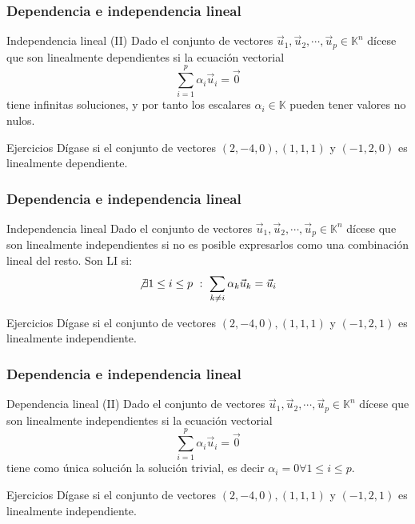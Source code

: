 \documentclass{beamer}
\begin{document}
\begin{frame}
  \frametitle{Dependencia e independencia lineal}
  \begin{block}{Independencia lineal (II)}
Dado el conjunto de vectores $\vec u_1,\vec u_2,\cdots,\vec u_p\in\mathbb K^n$ d\'icese que son linealmente dependientes si la ecuaci\'on vectorial
\[\sum_{i=1}^p \alpha_i \vec u_i = \vec 0\]
tiene infinitas soluciones, y por tanto los escalares $\alpha_i\in\mathbb K$ pueden tener valores no nulos.
\end{block}
  \begin{block}{Ejercicios}
D\'igase si el conjunto de vectores $(2,-4,0), (1,1,1)$ y $(-1,2,0)$ es linealmente dependiente.
\end{block}

\end{frame}




\begin{frame}
  \frametitle{Dependencia e independencia lineal}
  \begin{block}{Independencia lineal}
Dado el conjunto de vectores $\vec u_1,\vec u_2,\cdots,\vec u_p\in\mathbb K^n$ d\'icese que son linealmente independientes si no es posible expresarlos como una combinaci\'on lineal del resto. Son LI si:
\[\not\exists 1\leq i\leq p\ : \ \sum_{k\neq i} \alpha_k \vec u_k = \vec u_i\]
\end{block}
  \begin{block}{Ejercicios}
D\'igase si el conjunto de vectores $(2,-4,0), (1,1,1)$ y $(-1,2,1)$ es linealmente independiente.
\end{block}


\end{frame}



\begin{frame}
  \frametitle{Dependencia e independencia lineal}
  \begin{block}{Dependencia lineal (II)}
Dado el conjunto de vectores $\vec u_1,\vec u_2,\cdots,\vec u_p\in\mathbb K^n$ d\'icese que son linealmente independientes si la ecuaci\'on vectorial
\[\sum_{i=1}^p \alpha_i \vec u_i = \vec 0\]
tiene como \'unica soluci\'on la soluci\'on trivial, es decir $\alpha_i=0\forall 1\leq i\leq p$.
\end{block}
  \begin{block}{Ejercicios}
D\'igase si el conjunto de vectores $(2,-4,0), (1,1,1)$ y $(-1,2,1)$ es linealmente independiente.
\end{block}
\end{frame}
\end{document}
